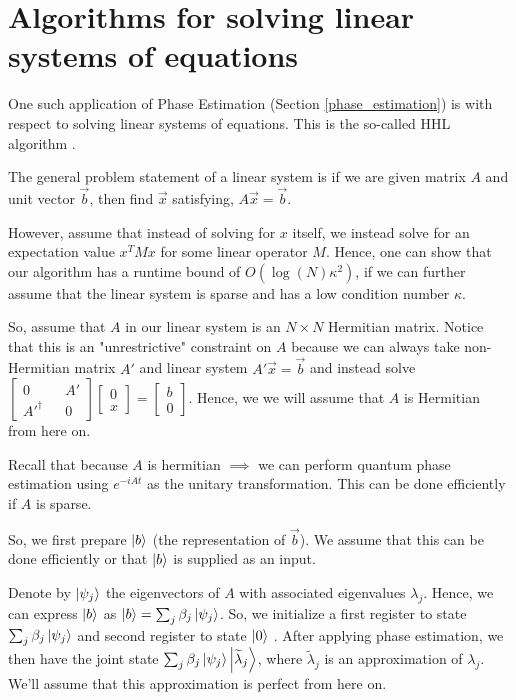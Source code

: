 \documentclass[main.tex]{subfiles}
\begin{document}
\section{Algorithms for solving linear systems of equations}

One such application of Phase Estimation (Section \ref{phase_estimation}) is with respect to solving linear systems of equations. This is the so-called HHL algorithm \cite{lloyd2010quantum}.

The general problem statement of a linear system is if we are given matrix $A$ and unit vector $\vec{b}$, then find $\vec{x}$ satisfying, $A\vec{x} = \vec{b}$. 

However, assume that instead of solving for $x$ itself, we instead solve for an expectation value $x^T M x$ for some linear operator $M$. Hence, one can show that our algorithm has a runtime bound of $O(\log(N)\kappa ^{2})$, if we can further assume that the linear system is sparse and has a low condition number $\kappa$.

So, assume that $A$ in our linear system is an $N \times N$ Hermitian matrix. Notice that this is an "unrestrictive" constraint on $A$ because we can always take non-Hermitian matrix $A'$ and linear system $A' \vec{x} = \vec{b}$ and instead solve $\begin{bmatrix}
	0 && A' \\ A'^\dag && 0
\end{bmatrix} \begin{bmatrix} 0 \\ x \end{bmatrix} = \begin{bmatrix} b \\ 0 \end{bmatrix}$. Hence, we we will assume that $A$ is Hermitian from here on. 

Recall that because $A$ is hermitian $\implies$ we can perform quantum phase estimation using $e^{-iAt}$ as the unitary transformation. This can be done efficiently if $A$ is sparse.

So, we first prepare $\ket{b}$ (the representation of $\vec{b}$). We assume that this can be done efficiently or that $\ket{b}$ is supplied as an input.

Denote by $\ket{\psi_j}$ the eigenvectors of $A$ with associated eigenvalues $\lambda_j$. Hence, we can express $\ket{b}$ as $\ket{b} = \sum_j \beta_j \ket{\psi_j}$.  So, we initialize a first register to state $\sum_j \beta_j \ket{\psi_j}$ and second register to state $\ket{0}$ . After applying phase estimation, we then have the joint state $\sum_j \beta_j \ket{\psi_j} \ket{\widetilde{\lambda}_j}$, where $\widetilde{\lambda}_j$ is an approximation of $\lambda_j$. We'll assume that this approximation is perfect from here on. 
\end{document}
